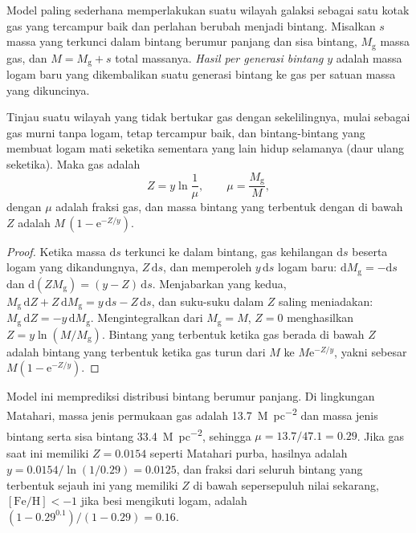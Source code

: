 Model paling sederhana memperlakukan suatu wilayah galaksi sebagai satu kotak
gas yang tercampur baik dan perlahan berubah menjadi bintang. Misalkan $s$
massa yang terkunci dalam bintang berumur panjang dan sisa bintang,
$M_\mathrm{g}$ massa gas, dan $M = M_\mathrm{g} + s$ total massanya. \emph{Hasil
per generasi bintang} $y$ adalah massa logam baru yang dikembalikan suatu
generasi bintang ke gas per satuan massa yang dikuncinya.

\begin{theorem}\label{thm:b3:origin-of-elements:closed-box}
Tinjau suatu wilayah yang tidak bertukar gas dengan sekelilingnya, mulai
sebagai gas murni tanpa logam, tetap tercampur baik, dan bintang-bintang
yang membuat logam mati seketika sementara yang lain hidup selamanya
(daur ulang seketika). Maka  gas adalah
\[
Z = y \ln\frac{1}{\mu}, \qquad \mu = \frac{M_\mathrm{g}}{M},
\]
dengan $\mu$ adalah fraksi gas, dan massa bintang yang terbentuk dengan
 di bawah $Z$ adalah \mbox{$M\,(1 - \mathrm{e}^{-Z/y})$}.
\end{theorem}

\begin{proof}
Ketika massa $\mathrm{d}s$ terkunci ke dalam bintang, gas kehilangan
$\mathrm{d}s$ beserta logam yang dikandungnya, $Z\,\mathrm{d}s$,
dan memperoleh $y\,\mathrm{d}s$ logam baru:
$\mathrm{d}M_\mathrm{g} = -\mathrm{d}s$ dan
$\mathrm{d}(Z M_\mathrm{g}) = (y - Z)\,\mathrm{d}s$. Menjabarkan
yang kedua, $M_\mathrm{g}\,\mathrm{d}Z + Z\,\mathrm{d}M_\mathrm{g} =
y\,\mathrm{d}s - Z\,\mathrm{d}s$, dan suku-suku dalam $Z$ saling meniadakan:
$M_\mathrm{g}\,\mathrm{d}Z = -y\,\mathrm{d}M_\mathrm{g}$. Mengintegralkan
dari $M_\mathrm{g} = M$, $Z = 0$ menghasilkan $Z = y\ln(M/M_\mathrm{g})$. Bintang
yang terbentuk ketika  gas berada di bawah $Z$ adalah bintang yang
terbentuk ketika gas turun dari $M$ ke $M\mathrm{e}^{-Z/y}$, yakni sebesar
$M(1 - \mathrm{e}^{-Z/y})$.
\end{proof}

Model ini memprediksi distribusi  bintang berumur panjang.
Di lingkungan Matahari, massa jenis permukaan gas adalah
\qty{13.7}{M_\odot.pc^{-2}} dan massa jenis bintang serta sisa bintang
\qty{33.4}{M_\odot.pc^{-2}}, sehingga $\mu = 13.7/47.1 = 0.29$. Jika gas saat
ini memiliki $Z = 0.0154$ seperti Matahari purba, hasilnya
adalah $y = 0.0154/\ln(1/0.29) = 0.0125$, dan fraksi dari seluruh bintang yang
terbentuk sejauh ini yang memiliki $Z$ di bawah sepersepuluh nilai sekarang,
$[\mathrm{Fe/H}] < -1$ jika besi mengikuti logam, adalah
$(1 - 0.29^{0.1})/(1 - 0.29) = 0.16$.

